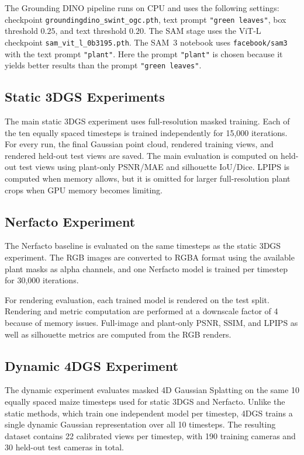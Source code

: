 \documentclass[sigconf]{acmart}
\begin{document}
The Grounding DINO pipeline runs on CPU and uses the following settings: checkpoint \texttt{groundingdino\_swint\_ogc.pth}, text prompt \texttt{"green leaves"}, box threshold $0.25$, and text threshold $0.20$. The SAM stage uses the ViT-L checkpoint \texttt{sam\_vit\_l\_0b3195.pth}. The SAM~3 notebook uses \texttt{facebook/sam3} with the text prompt \texttt{"plant"}. Here the prompt \texttt{"plant"} is chosen because it yields better results than the prompt \texttt{"green leaves"}. 


\subsection{Static 3DGS Experiments}
The main static 3DGS experiment uses full-resolution masked training. Each of the ten equally spaced timesteps is trained independently for 15,000 iterations. For every run, the final Gaussian point cloud, rendered training views, and rendered held-out test views are saved. The main evaluation is computed on held-out test views using plant-only PSNR/MAE and silhouette IoU/Dice. LPIPS is computed when memory allows, but it is omitted for larger full-resolution plant crops when GPU memory becomes limiting.

\subsection{Nerfacto Experiment}
The Nerfacto baseline is evaluated on the same timesteps as the static 3DGS experiment. The RGB images are converted to RGBA format using the available plant masks as alpha channels, and one Nerfacto model is trained per timestep for 30,000 iterations.

For rendering evaluation, each trained model is rendered on the test split. Rendering and metric computation are performed at a downscale factor of 4 because of memory issues. Full-image and plant-only PSNR, SSIM, and LPIPS as well as silhouette metrics are computed from the RGB renders.

\subsection{Dynamic 4DGS Experiment}
The dynamic experiment evaluates masked 4D Gaussian Splatting on the same 10 equally spaced maize timesteps used for static 3DGS and Nerfacto. Unlike the static methods, which train one independent model per timestep, 4DGS trains a single dynamic Gaussian representation over all 10 timesteps. The resulting dataset contains 22 calibrated views per timestep, with 190 training cameras and 30 held-out test cameras in total.
\end{document}
